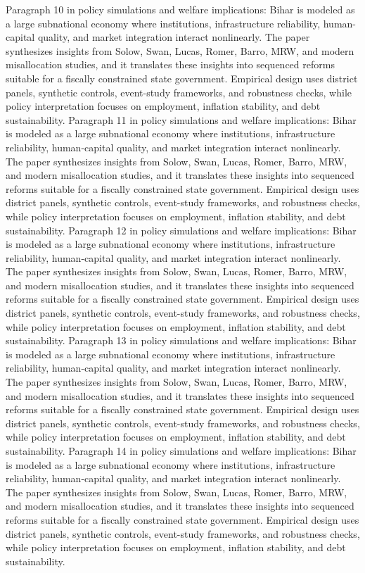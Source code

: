 \documentclass[preprint,12pt]{elsarticle}
\begin{document}
Paragraph 10 in policy simulations and welfare implications: Bihar is modeled as a large subnational economy where institutions, infrastructure reliability, human-capital quality, and market integration interact nonlinearly. The paper synthesizes insights from Solow, Swan, Lucas, Romer, Barro, MRW, and modern misallocation studies, and it translates these insights into sequenced reforms suitable for a fiscally constrained state government. Empirical design uses district panels, synthetic controls, event-study frameworks, and robustness checks, while policy interpretation focuses on employment, inflation stability, and debt sustainability.
Paragraph 11 in policy simulations and welfare implications: Bihar is modeled as a large subnational economy where institutions, infrastructure reliability, human-capital quality, and market integration interact nonlinearly. The paper synthesizes insights from Solow, Swan, Lucas, Romer, Barro, MRW, and modern misallocation studies, and it translates these insights into sequenced reforms suitable for a fiscally constrained state government. Empirical design uses district panels, synthetic controls, event-study frameworks, and robustness checks, while policy interpretation focuses on employment, inflation stability, and debt sustainability.
Paragraph 12 in policy simulations and welfare implications: Bihar is modeled as a large subnational economy where institutions, infrastructure reliability, human-capital quality, and market integration interact nonlinearly. The paper synthesizes insights from Solow, Swan, Lucas, Romer, Barro, MRW, and modern misallocation studies, and it translates these insights into sequenced reforms suitable for a fiscally constrained state government. Empirical design uses district panels, synthetic controls, event-study frameworks, and robustness checks, while policy interpretation focuses on employment, inflation stability, and debt sustainability.
Paragraph 13 in policy simulations and welfare implications: Bihar is modeled as a large subnational economy where institutions, infrastructure reliability, human-capital quality, and market integration interact nonlinearly. The paper synthesizes insights from Solow, Swan, Lucas, Romer, Barro, MRW, and modern misallocation studies, and it translates these insights into sequenced reforms suitable for a fiscally constrained state government. Empirical design uses district panels, synthetic controls, event-study frameworks, and robustness checks, while policy interpretation focuses on employment, inflation stability, and debt sustainability.
Paragraph 14 in policy simulations and welfare implications: Bihar is modeled as a large subnational economy where institutions, infrastructure reliability, human-capital quality, and market integration interact nonlinearly. The paper synthesizes insights from Solow, Swan, Lucas, Romer, Barro, MRW, and modern misallocation studies, and it translates these insights into sequenced reforms suitable for a fiscally constrained state government. Empirical design uses district panels, synthetic controls, event-study frameworks, and robustness checks, while policy interpretation focuses on employment, inflation stability, and debt sustainability.
\end{document}
